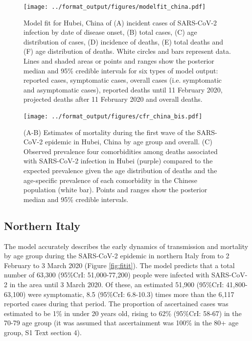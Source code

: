 \documentclass{article}
\begin{document}
\begin{figure}[h]
	\texttt{[image: ../format\_output/figures/modelfit\_china.pdf]}
	\caption{Model fit for Hubei, China of (A) incident cases of SARS-CoV-2 infection by date of disease onset, (B) total cases, (C) age distribution of cases, (D) incidence of deaths, (E) total deaths and (F) age distribution of deaths. White circles and bars represent data. Lines and shaded areas or points and ranges show the posterior median and 95\% credible intervals for six types of model output: reported cases, symptomatic cases, overall cases (i.e. symptomatic and asymptomatic cases), reported deaths until 11 February 2020, projected deaths after 11 February 2020 and overall deaths.}
	\label{fig:fit}
\end{figure}

\begin{figure}[h]
	\texttt{[image: ../format\_output/figures/cfr\_china\_bis.pdf]}
	\caption{(A-B) Estimates of mortality during the first wave of the SARS-CoV-2 epidemic in Hubei, China by age group and overall. (C) Observed prevalence four comorbidities among deaths associated with SARS-CoV-2 infection in Hubei (purple) compared to the expected prevalence given the age distribution of deaths and the age-specific prevalence of each comorbidity in the Chinese population (white bar). Points and ranges show the posterior median and 95\% credible intervals.}
	\label{fig:mortality}
\end{figure}



\subsection*{Northern Italy}

The model accurately describes the early dynamics of transmission and mortality by age group during the SARS-CoV-2 epidemic in northern Italy from to 2 February to 3 March 2020 (Figure \ref{fig:fitit}). 
The model predicts that a total number of 63,300 (95\%CrI: 51,000-77,200) people were infected with SARS-CoV-2 in the area until 3 March 2020.
Of these, an estimated 51,900 (95\%CrI: 41,800-63,100) were symptomatic, 8.5 (95\%CrI: 6.8-10.3) times more than the 6,117 reported cases during that period.
The proportion of ascertained cases was estimated to be 1\% in under 20 years old, rising to 62\% (95\%CrI: 58-67) in the 70-79 age group (it was assumed that ascertainment was 100\% in the 80+ age group, S1 Text section 4).
\end{document}
